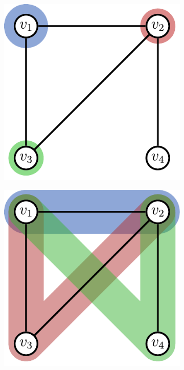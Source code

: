 \begin{figure}[ht]
	\centering
	\begin{subfigure}{0.33\textwidth}
		\centering
		\includegraphics[width=0.8\linewidth]{gfx/related-work/wl1-neighbors.pdf}
		\label{fig:related:wl-neighbors:1}
	\end{subfigure}%
	\begin{subfigure}{0.33\textwidth}
		\centering
		\includegraphics[width=0.8\linewidth]{gfx/related-work/wl2-neighbors.pdf}
		\label{fig:related:wl-neighbors:2}
	\end{subfigure}%

\end{figure}
